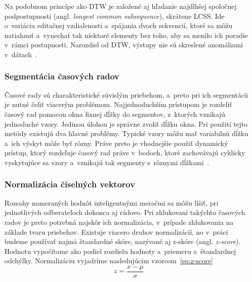 \documentclass[a4paper,twoside,slovak,12pt,appendix]{article}
\begin{document}
Na podobnom princípe ako DTW je založené aj hľadanie najdlhšej spoločnej
podpostupnosti (angl. \textit{longest common subsequence}), skrátene LCSS. Ide
o~variáciu editačnej vzdialenosti a~spájania dvoch sekvencií, ktoré sa môžu
natiahnuť a~vynechať tak niektoré elementy bez toho, aby sa menilo ich poradie
v~rámci postupnosti. Narozdiel od DTW, výstupy nie sú skreslené anomáliami
v~dátach~\cite{Fu2011}.

\subsubsection{Segmentácia časových radov}
Časové rady sú charakteristické súvislým priebehom, a~preto pri ich segmentácii
je nutné čeliť viacerým problémom. Najjednoduchším prístupom je rozdeliť časový
rad pomocou okna fixnej dĺžky do segmentov, z~ktorých vznikajú jednoduché vzory.
Jedinou úlohou je správne zvoliť dĺžku okna. Pri použití tejto metódy existujú
dva hlavné problémy. Typické vzory môžu mať variabilnú dĺžku a~ich výskyt môže
byť rôzny. Práve preto je vhodnejšie použiť dynamický prístup, ktorý rozdeľuje
časový rad práve v~bodoch, ktoré zachovávajú cyklicky vyskytujúce sa vzory
a~vznikajú tak segmenty s~rôznymi dĺžkami~\cite{Fu2011}.

\subsubsection{Normalizácia číselných vektorov}
\label{c:z-score}
Rozsahy nameraných hodnôt inteligentnými meračmi sa môžu líšiť, pri jednotlivých
odberateľoch dokonca aj rádovo. Pri zhlukovaní takýchto časových radov je preto
potrebná najskôr ich normalizácia, v~prípade zhlukovania na základe tvaru
priebehov. Existuje viacero druhov normalizácií, no v~práci budeme používať
najmä štandardné skóre, nazývané aj z-skóre (angl. \textit{z-score}). Hodnotu
vypočítame ako podiel rozdielu hodnoty a~priemeru a~štandardnej odchýlky.
Normalizáciu vyjadríme nasledujúcim
vzorcom~\ref{eq:z-score}~\cite{Arampatzis2009}
\begin{equation}
	\label{eq:z-score}
  z = \frac{x-\mu}{\sigma}
\end{equation}

\end{document}
